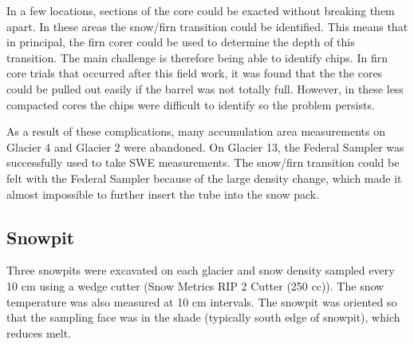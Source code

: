 \documentclass[12pt]{article}
\begin{document}
In a few locations, sections of the core could be exacted without breaking them apart. In these areas the snow/firn transition could be identified. This means that in principal, the firn corer could be used to determine the depth of this transition. The main challenge is therefore being able to identify chips. In firn core trials that occurred after this field work, it was found that the the cores could be pulled out easily if the barrel was not totally full. However, in these less compacted cores the chips were difficult to identify so the problem persists. 

As a result of these complications, many accumulation area measurements on Glacier 4 and Glacier 2 were abandoned. On Glacier 13, the Federal Sampler was successfully used to take SWE measurements. The snow/firn transition could be felt with the Federal Sampler because of the large density change, which made it almost impossible to further insert the tube into the snow pack.  

\subsection{Snowpit}
\label{sec:snowpit}


Three snowpits were excavated on each glacier and snow density sampled every 10 cm using a wedge cutter (Snow Metrics RIP 2 Cutter (250 cc)). The snow temperature was also measured at 10 cm intervals. The snowpit was oriented so that the sampling face was in the shade (typically south edge of snowpit), which reduces melt. 
\end{document}

